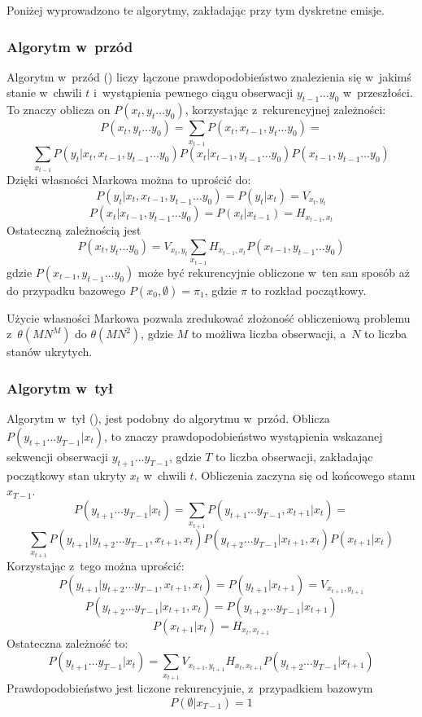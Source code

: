 Poniżej wyprowadzono te algorytmy, zakładając przy tym dyskretne emisje.

\subsubsection{Algorytm w~przód}

Algorytm w~przód () liczy łączone prawdopodobieństwo znalezienia się w~jakimś stanie w~chwili $t$
i~wystąpienia pewnego ciągu obserwacji $y_{t-1} \dots y_0$ w~przeszłości. To znaczy oblicza on $P(x_t, y_t \dots y_0)$,
korzystając z~rekurencyjnej zależności:
$$P(x_t, y_t \dots y_0) = \sum_{x_{t-1}} P(x_t, x_{t-1}, y_t \dots y_0) =$$
$$\sum_{x_{t-1}} P(y_t | x_t, x_{t-1}, y_{t-1} \dots y_0) P(x_t | x_{t-1}, y_{t-1} \dots y_0) P(x_{t-1}, y_{t-1} \dots y_0)$$
Dzięki własności Markowa można to uprościć do:
$$P(y_t | x_t, x_{t-1}, y_{t-1} \dots y_0) = P(y_t | x_t) = V_{x_t, y_t}$$
$$P(x_t | x_{t-1}, y_{t-1} \dots y_0) = P(x_t | x_{t-1}) = H_{x_{t-1}, x_t}$$
Ostateczną zależnością jest
$$P(x_t, y_t \dots y_0) = V_{x_t, y_t} \sum_{x_{t-1}} H_{x_{t-1}, x_t} P(x_{t-1}, y_{t-1} \dots y_0)$$
gdzie $P(x_{t-1}, y_{t-1} \dots y_0)$ może być rekurencyjnie obliczone w~ten san sposób aż do przypadku bazowego $P(x_0, \emptyset) = \pi_1$, gdzie $\pi$ to rozkład początkowy.

Użycie własności Markowa pozwala zredukować złożoność obliczeniową problemu z~$\theta(MN^M)$ do $\theta(MN^2)$, gdzie $M$ to możliwa liczba obserwacji, a~$N$ to liczba stanów ukrytych.

\subsubsection{Algorytm w~tył}

Algorytm w~tył (), jest podobny do algorytmu w~przód. Oblicza $P(y_{t+1} \dots y_{T-1} | x_t)$, to znaczy prawdopodobieństwo wystąpienia wskazanej sekwencji obserwacji $y_{t+1} \dots y_{T-1}$, gdzie $T$ to liczba obserwacji, zakładając początkowy stan ukryty $x_t$ w~chwili $t$. Obliczenia zaczyna się od końcowego stanu $x_{T-1}$.
$$P(y_{t+1} \dots y_{T-1} | x_t) = \sum_{x_{t+1}} P(y_{t+1} \dots y_{T-1}, x_{t+1} | x_t) =$$
$$\sum_{x_{t+1}} P(y_{t+1} | y_{t+2} \dots y_{T-1}, x_{t+1}, x_t) P(y_{t+2} \dots y_{T-1} | x_{t+1}, x_t) P(x_{t+1} | x_t)$$
Korzystając z~tego można uprościć:
$$P(y_{t+1} | y_{t+2} \dots y_{T-1}, x_{t+1}, x_t) = P(y_{t+1} | x_{t+1}) = V_{x_{t+1},y_{t+1}}$$
$$P(y_{t+2} \dots y_{T-1} | x_{t+1}, x_t) = P(y_{t+2} \dots y_{T-1} | x_{t+1})$$
$$P(x_{t+1} | x_t) = H_{x_t,x_{t+1}}$$
Ostateczna zależność to:
$$P(y_{t+1} \dots y_{T-1} | x_t) =  \sum_{x_{t+1}} V_{x_{t+1},y_{t+1}} H_{x_t,x_{t+1}} P(y_{t+2} \dots y_{T-1} | x_{t+1})$$
Prawdopodobieństwo jest liczone rekurencyjnie, z~przypadkiem bazowym
$$P(\emptyset | x_{T-1}) = 1$$


